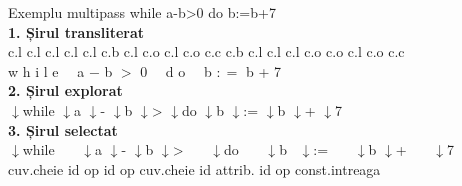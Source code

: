 \documentclass[pdf]{beamer}
\begin{document}
\begin{frame}{Exemplu multipass}
\mbox{}
\noindent
while a-b>0 do b:=b+7 \\
\textbf{1. Șirul transliterat} \\
c.l c.l c.l c.l c.l c.b c.l c.o c.l c.o c.c c.b c.l c.l c.l c.o c.o c.l c.o c.c \\
w h i l e  \  \  a $-$ b $>$ 0  \  \  d o  \ \  b $: =$ b + 7 \\
\noindent
\textbf{2. Șirul explorat} \\
$\downarrow$while $\downarrow$a $\downarrow$- $\downarrow$b $\downarrow$> $\downarrow$do $\downarrow$b $\downarrow$:= $\downarrow$b $\downarrow$+ $\downarrow$7 \\
\noindent
\textbf{3. Șirul selectat} \\
$\downarrow$while \ \ \ $\downarrow$a $\downarrow$- $\downarrow$b $\downarrow$> \ \ \ $\downarrow$do \ \ \  $\downarrow$b \ $\downarrow$:=  \ \ \ $\downarrow$b $\downarrow$+ \ \ \ $\downarrow$7 \\
cuv.cheie  id  op  id  op  cuv.cheie  id attrib. id  op  const.intreaga
\end{frame}
\end{document}
